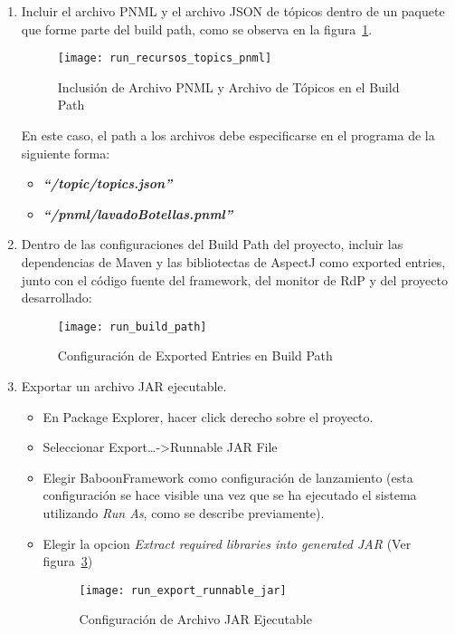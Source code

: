 \begin{enumerate}
  \item Incluir el archivo PNML y el archivo JSON de tópicos dentro de un
  paquete que forme parte del build path, como se observa en la
  figura~\ref{fig:run_recursos_topics_pnml}.
  \begin{figure}[H]
    \centering
    \texttt{[image: run\_recursos\_topics\_pnml]}
    \caption{Inclusión de Archivo PNML y Archivo de Tópicos en el Build
    Path}
    \label{fig:run_recursos_topics_pnml}
   \end{figure}
   En este caso, el path a los archivos debe especificarse en el programa de la
   siguiente forma:
   \begin{itemize}
     \item \textbf{\emph{``/topic/topics.json''}}
     \item \textbf{\emph{``/pnml/lavadoBotellas.pnml''}}
   \end{itemize}
   
   \item Dentro de las configuraciones del Build Path del proyecto, incluir
   las dependencias de Maven y las bibliotectas de AspectJ como exported
   entries, junto con el código fuente del framework, del monitor de RdP y del
   proyecto desarrollado:
    \begin{figure}[H]
    \centering
    \texttt{[image: run\_build\_path]}
    \caption{Configuración de Exported Entries en Build Path}
    \label{fig:run_build_path}
    \end{figure}
    
   \item Exportar un archivo JAR ejecutable.
       \begin{itemize}
         \item En Package Explorer, hacer click derecho sobre el proyecto.
         \item Seleccionar Export\ldots -\textgreater Runnable JAR File
         \item Elegir BaboonFramework como configuración de lanzamiento
         (esta configuración se hace visible una vez que se ha ejecutado
         el sistema utilizando \emph{Run As}, como se describe previamente).
         \item Elegir la opcion \emph{Extract required libraries into generated
         JAR} (Ver figura~\ref{fig:run_export_runnable_jar})
         \begin{figure}[H]
            \centering
            \texttt{[image: run\_export\_runnable\_jar]}
            \caption{Configuración de Archivo JAR Ejecutable}
            \label{fig:run_export_runnable_jar}
         \end{figure}
       \end{itemize}
\end{enumerate}